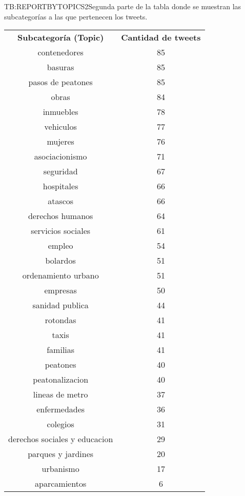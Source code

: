 \begin{table}[Resultados de la clasificación de los tweets semánticamente por subcategorías (II).]{TB:REPORTBYTOPICS2}{Segunda parte de la tabla donde se muestran las subcategorías a las que pertenecen los tweets.}
	\begin{tabular}{|c|c|}
		\hline
		\textbf{Subcategoría (Topic)} & \textbf{Cantidad de tweets} \\
		contenedores & 85 \\
	basuras & 85 \\
	pasos de peatones & 85 \\
	obras & 84 \\
	inmuebles & 78 \\
	vehiculos & 77 \\
	mujeres & 76 \\
	asociacionismo & 71 \\
	seguridad & 67 \\
	hospitales & 66 \\
	atascos & 66 \\
	derechos humanos & 64 \\
	servicios sociales & 61 \\
	empleo & 54 \\
	bolardos & 51 \\
	ordenamiento urbano & 51 \\
	empresas & 50 \\
	sanidad publica & 44 \\
	rotondas & 41 \\
	taxis & 41 \\
	familias & 41 \\
	peatones & 40 \\
	peatonalizacion & 40 \\
	lineas de metro & 37 \\
	enfermedades & 36 \\
	colegios & 31 \\
	derechos sociales y educacion & 29 \\
	parques y jardines & 20 \\
	urbanismo & 17 \\
	aparcamientos & 6 \\
		\hline \hline
		\hline
	\end{tabular}
\end{table}